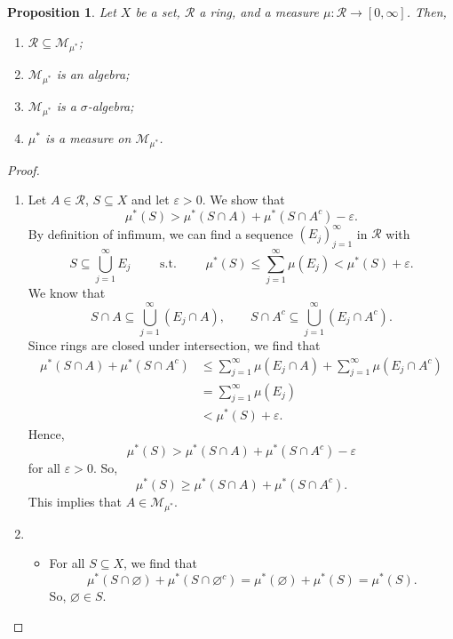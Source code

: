 \documentclass[a4paper, openany]{memoir}
\theoremstyle{definition}
\theoremstyle{plain}
\newtheorem{proposition}[definition]{Proposition}
\begin{document}
    \begin{proposition}
        Let $X$ be a set, $\mathcal{R}$ a ring, and a measure $\mu \colon \mathcal{R} \to [0, \infty]$. Then,
        \begin{enumerate}
            \item $\mathcal{R} \subseteq \mathcal{M}_{\mu^*}$;
            \item $\mathcal{M}_{\mu^*}$ is an algebra;
            \item $\mathcal{M}_{\mu^*}$ is a $\sigma$-algebra;
            \item $\mu^*$ is a measure on $\mathcal{M}_{\mu^*}$.
        \end{enumerate}
    \end{proposition}
    \begin{proof}
        \hspace{0pt}
        \begin{enumerate}
            \item Let $A \in \mathcal{R}$, $S \subseteq X$ and let $\varepsilon > 0$. We show that
            \[\mu^*(S) > \mu^*(S \cap A) + \mu^*(S \cap A^c) - \varepsilon.\]
            By definition of infimum, we can find a sequence $(E_j)_{j=1}^\infty$ in $\mathcal{R}$ with 
            \[S \subseteq \bigcup_{j=1}^\infty E_j \qquad \textrm{ s.t. } \qquad \mu^*(S) \leq \sum_{j=1}^\infty \mu(E_j) < \mu^*(S) + \varepsilon.\]
            We know that 
            \[S \cap A \subseteq \bigcup_{j=1}^\infty (E_j \cap A), \qquad S \cap A^c \subseteq \bigcup_{j=1}^\infty (E_j \cap A^c).\]
            Since rings are closed under intersection, we find that
            \begin{align*}
                \mu^*(S \cap A) + \mu^*(S \cap A^c) &\leq \sum_{j=1}^\infty \mu(E_j \cap A) + \sum_{j=1}^\infty \mu(E_j \cap A^c) \\
                &= \sum_{j=1}^\infty \mu(E_j) \\
                &< \mu^*(S) + \varepsilon.
            \end{align*}
            Hence,
            \[\mu^*(S) > \mu^*(S \cap A) + \mu^*(S \cap A^c) - \varepsilon\]
            for all $\varepsilon > 0$. So,
            \[\mu^*(S) \geq \mu^*(S \cap A) + \mu^*(S \cap A^c).\]
            This implies that $A \in \mathcal{M}_{\mu^*}$.

            \item \begin{itemize}
                \item For all $S \subseteq X$, we find that
                \[\mu^*(S \cap \varnothing) + \mu^*(S \cap \varnothing^c) = \mu^*(\varnothing) + \mu^*(S) = \mu^*(S).\]
                So, $\varnothing \in S$.


\end{itemize}
\end{enumerate}
\end{proof}
\end{document}
